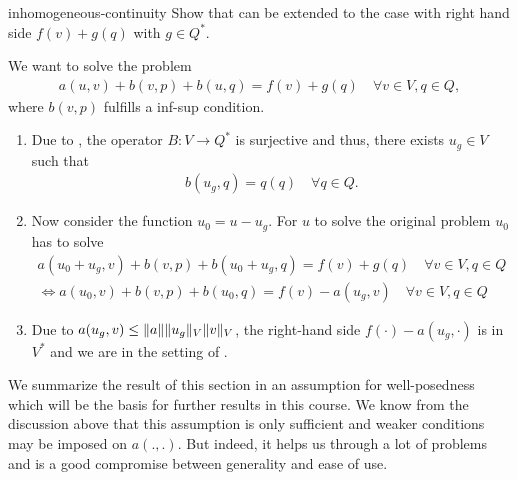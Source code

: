 \begin{Problem}{inhomogeneous-continuity}
  Show that  can be extended to the
  case with right hand side $f(v)+g(q)$ with $g\in Q^*$.

\begin{solution}
  We want to solve the problem
  \begin{align}
    a(u,v) + b(v,p) + b(u,q) = f(v)+g(q) \quad\forall v\in V, q\in Q,
  \end{align}
  where $b(v,p)$ fulfills a inf-sup condition.

  \begin{enumerate}
  \item Due to , the
    operator $B: V\to Q^*$ is surjective and thus, there exists
    $u_g\in V$ such that
    \begin{gather}
      b(u_g,q) = q(q) \quad\forall q\in Q.
    \end{gather}
  \item Now consider the function $u_0 = u-u_g$. For $u$ to solve the
    original problem $u_0$ has to solve
    \begin{align}
      a(u_0+u_g,v) + b(v,p) + b(u_0+u_g,q) = f(v)+g(q) \quad\forall v\in V, q\in Q\\
      \Leftrightarrow a(u_0,v) + b(v,p) + b(u_0,q) = f(v)-a(u_g,v) \quad\forall v\in V, q\in Q
    \end{align}
  \item Due to $a(u_g,v) \leq \lVert a\rVert\lVert u_g\rVert_V\lVert v\rVert_V$,
    the right-hand side $f(\cdot)-a(u_g,\cdot)$ is in $V^*$
    and we are in the setting of
    .
  \end{enumerate}
\end{solution}
\end{Problem}

\begin{intro}
  We summarize the result of this section in an assumption for
  well-posedness which will be the basis for further results in this
  course. We know from the discussion above that this assumption is
  only sufficient and weaker conditions may be imposed on
  $a(.,.)$. But indeed, it helps us through a lot of problems and is a
  good compromise between generality and ease of use.
\end{intro}

